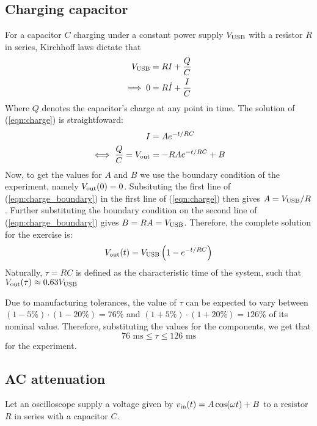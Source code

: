\documentclass{article}
\begin{document}
\subsection{Charging capacitor}
For a capacitor $C$ charging under a constant power supply $V_{\text{USB}}$ with a resistor $R$ in series, Kirchhoff laws dictate that
\begin{equation}
    \begin{split}
        V_{\text{USB}} &= RI + \frac{Q}{C} 
        \\ \implies 0 &= R\dot{I} + \frac{I}{C}
    \end{split}
    \label{eqn:charge}
\end{equation}
Where $Q$ denotes the capacitor's charge at any point in time. The solution of (\ref{eqn:charge}) is straightfoward:
\begin{equation}
    \begin{split}
            I &= Ae^{-t/RC} \\
            \iff \frac{Q}{C} = V_{\text{out}} &= -RAe^{-t/RC} + B
    \end{split}
    \label{eqn:charge_boundary}
\end{equation}
Now, to get the values for $A$ and $B$ we use the boundary condition of the experiment, namely $V_{\text{out}}(0) = 0$. Subsituting the first line of (\ref{eqn:charge_boundary}) in the first line of (\ref{eqn:charge}) then gives $A = V_{\text{USB}}/R$. Further substituting the boundary condition on the second line of (\ref{eqn:charge_boundary}) gives $B = RA = V_{\text{USB}}$. Therefore, the complete solution for the exercise is:
\begin{equation}
    V_{\text{out}}(t) = V_{\text{USB}}\left( 1 - e^{-t/RC}\right)
    \label{eqn:charge_ideal}
\end{equation}
Naturally, $\tau = RC$ is defined as the characteristic time of the system, such that $V_{\text{out}}(\tau) \approx 0.63 V_{\text{USB}}$
\par Due to manufacturing tolerances, the value of $\tau$ can be expected to vary between $(1-5\%)\cdot(1-20\%) = 76\%$ and $(1+5\%)\cdot(1+20\%) = 126\%$ of its nominal value. Therefore, substituting the values for the components, we get that
\begin{equation}
    76\text{ ms} \le \tau \le 126 \text { ms}
\end{equation}
for the experiment.
\subsection{AC attenuation}
Let an oscilloscope supply a voltage given by $v_{\text{in}}(t) = A\cos(\omega t) + B$ to a resistor $R$ in series with a capacitor $C$. 
\end{document}
